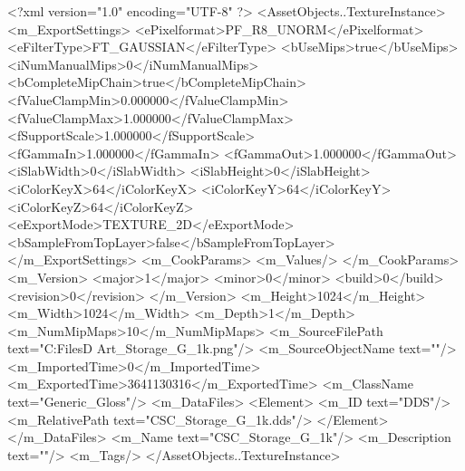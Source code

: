 <?xml version="1.0" encoding="UTF-8" ?>
<AssetObjects..TextureInstance>
	<m_ExportSettings>
		<ePixelformat>PF_R8_UNORM</ePixelformat>
		<eFilterType>FT_GAUSSIAN</eFilterType>
		<bUseMips>true</bUseMips>
		<iNumManualMips>0</iNumManualMips>
		<bCompleteMipChain>true</bCompleteMipChain>
		<fValueClampMin>0.000000</fValueClampMin>
		<fValueClampMax>1.000000</fValueClampMax>
		<fSupportScale>1.000000</fSupportScale>
		<fGammaIn>1.000000</fGammaIn>
		<fGammaOut>1.000000</fGammaOut>
		<iSlabWidth>0</iSlabWidth>
		<iSlabHeight>0</iSlabHeight>
		<iColorKeyX>64</iColorKeyX>
		<iColorKeyY>64</iColorKeyY>
		<iColorKeyZ>64</iColorKeyZ>
		<eExportMode>TEXTURE_2D</eExportMode>
		<bSampleFromTopLayer>false</bSampleFromTopLayer>
	</m_ExportSettings>
	<m_CookParams>
		<m_Values/>
	</m_CookParams>
	<m_Version>
		<major>1</major>
		<minor>0</minor>
		<build>0</build>
		<revision>0</revision>
	</m_Version>
	<m_Height>1024</m_Height>
	<m_Width>1024</m_Width>
	<m_Depth>1</m_Depth>
	<m_NumMipMaps>10</m_NumMipMaps>
	<m_SourceFilePath text="C:\Users\Shadow\Desktop\Working Files\3D Art\Textures\CSC_Storage_G_1k.png"/>
	<m_SourceObjectName text=""/>
	<m_ImportedTime>0</m_ImportedTime>
	<m_ExportedTime>3641130316</m_ExportedTime>
	<m_ClassName text="Generic_Gloss"/>
	<m_DataFiles>
		<Element>
			<m_ID text="DDS"/>
			<m_RelativePath text="CSC_Storage_G_1k.dds"/>
		</Element>
	</m_DataFiles>
	<m_Name text="CSC_Storage_G_1k"/>
	<m_Description text=""/>
	<m_Tags/>
</AssetObjects..TextureInstance>

